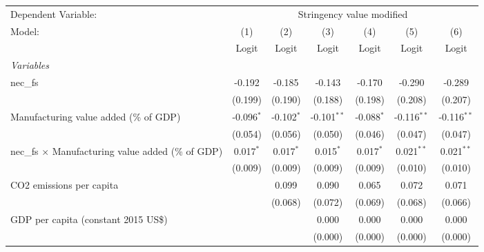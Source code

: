 
\begingroup
\centering
\begin{tabular}{lcccccc}
   \toprule
   Dependent Variable: & \multicolumn{6}{c}{Stringency value modified}\\
   Model:                                                    & (1)          & (2)          & (3)           & (4)            & (5)            & (6)\\  
                                                             &  Logit       & Logit        & Logit         & Logit          & Logit          & Logit\\  
   \midrule
   \emph{Variables}\\
   nec\_fs                                                   & -0.192       & -0.185       & -0.143        & -0.170         & -0.290         & -0.289\\   
                                                             & (0.199)      & (0.190)      & (0.188)       & (0.198)        & (0.208)        & (0.207)\\   
   Manufacturing value added (\% of GDP)                     & -0.096$^{*}$ & -0.102$^{*}$ & -0.101$^{**}$ & -0.088$^{*}$   & -0.116$^{**}$  & -0.116$^{**}$\\   
                                                             & (0.054)      & (0.056)      & (0.050)       & (0.046)        & (0.047)        & (0.047)\\   
   nec\_fs $\times$ Manufacturing value added (\% of GDP)    & 0.017$^{*}$  & 0.017$^{*}$  & 0.015$^{*}$   & 0.017$^{*}$    & 0.021$^{**}$   & 0.021$^{**}$\\   
                                                             & (0.009)      & (0.009)      & (0.009)       & (0.009)        & (0.010)        & (0.010)\\   
   CO2 emissions per capita                                  &              & 0.099        & 0.090         & 0.065          & 0.072          & 0.071\\   
                                                             &              & (0.068)      & (0.072)       & (0.069)        & (0.068)        & (0.066)\\   
   GDP per capita (constant 2015 US\$)                       &              &              & 0.000         & 0.000          & 0.000          & 0.000\\   
                                                             &              &              & (0.000)       & (0.000)        & (0.000)        & (0.000)\\   

\end{tabular}
